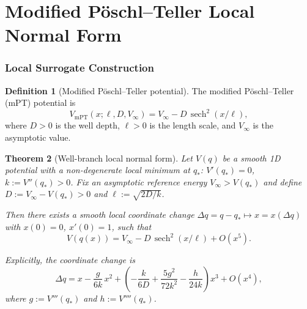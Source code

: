 \documentclass[12pt]{article}
\theoremstyle{plain}
\newtheorem{theorem}{Theorem}[section]
\theoremstyle{definition}
\newtheorem{definition}[theorem]{Definition}
\numberwithin{equation}{section}
\DeclareMathOperator{\sech}{sech}
\begin{document}
\part{Modified P\"oschl--Teller Local Normal Form}

\section{Local Surrogate Construction}\label{sec:mPT}

\begin{definition}[Modified P\"oschl--Teller potential]
The modified P\"oschl--Teller (mPT) potential is
\begin{equation}
V_{\mathrm{mPT}}(x;\ell,D,V_\infty)
= V_\infty - D\,\sech^2(x/\ell),
\end{equation}
where $D>0$ is the well depth, $\ell>0$ is the length scale, and
$V_\infty$ is the asymptotic value.
\end{definition}

\begin{theorem}[Well-branch local normal form]\label{thm:well}
Let $V(q)$ be a smooth 1D potential with a non-degenerate local
minimum at $q_*$: $V'(q_*)=0$, $k:=V''(q_*)>0$.
Fix an asymptotic reference energy $V_\infty>V(q_*)$ and define
$D:=V_\infty-V(q_*)>0$ and $\ell:=\sqrt{2D/k}$.

Then there exists a smooth local coordinate change
$\Delta q=q-q_*\mapsto x=x(\Delta q)$ with $x(0)=0$, $x'(0)=1$,
such that
\begin{equation}\label{eq:wellnormal}
\boxed{V(q(x)) = V_\infty - D\,\sech^2(x/\ell) + O(x^5).}
\end{equation}

Explicitly, the coordinate change is
\begin{equation}\label{eq:coordwell}
\Delta q = x
-\frac{g}{6k}\,x^2
+\left(-\frac{k}{6D}+\frac{5g^2}{72k^2}
-\frac{h}{24k}\right)x^3 + O(x^4),
\end{equation}
where $g:=V'''(q_*)$ and $h:=V''''(q_*)$.
\end{theorem}
\end{document}
